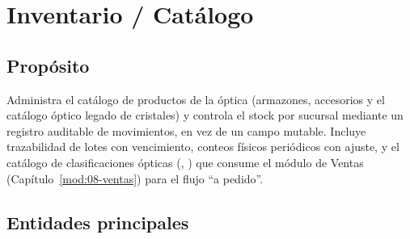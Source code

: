 \chapter{Inventario / Catálogo}
\label{mod:07-inventario-catalogo}

\section{Propósito}
\label{sec:07-proposito}

Administra el catálogo de productos de la óptica (armazones, accesorios y el catálogo óptico legado de cristales) y controla el stock por sucursal mediante un registro auditable de movimientos, en vez de un campo mutable. Incluye trazabilidad de lotes con vencimiento, conteos físicos periódicos con ajuste, y el catálogo de clasificaciones ópticas (, ) que consume el módulo de Ventas (Capítulo~\ref{mod:08-ventas}) para el flujo ``a pedido''.

\section{Entidades principales}
\label{sec:07-entidades}

